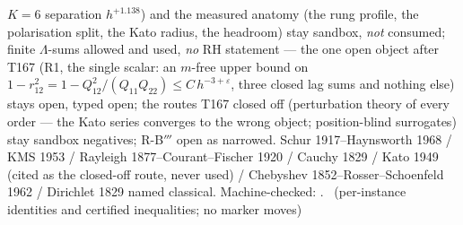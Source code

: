 \documentclass[11pt,a4paper]{article}
\theoremstyle{definition}
\begin{document}
$K=6$ separation $h^{+1.138}$) and the measured anatomy (the rung
profile, the polarisation split, the Kato radius, the headroom) stay
sandbox, \emph{not} consumed; finite $\Lambda$-sums allowed and used,
\emph{no} RH statement --- the one open object after T167 (R1, the
single scalar: an $m$-free upper bound on
$1-r_{12}^2=1-Q_{12}^2/(Q_{11}Q_{22})\le C\,h^{-3+\varepsilon}$, three
closed lag sums and nothing else) stays open, typed open; the routes
T167 closed off (perturbation theory of every order --- the Kato series
converges to the wrong object; position-blind surrogates) stay sandbox
negatives; R-B$'''$ open as narrowed.
Schur 1917--Haynsworth 1968 / KMS 1953 / Rayleigh 1877--Courant--Fischer
1920 / Cauchy 1829 / Kato 1949 (cited as the closed-off route, never
used) / Chebyshev 1852--Rosser--Schoenfeld 1962 / Dirichlet 1829 named
classical. Machine-checked:
.
\mE\ (per-instance identities and certified inequalities; no marker moves)
\par\smallskip
\end{document}
